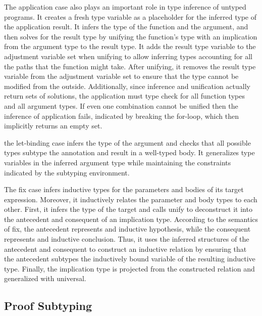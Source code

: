 \documentclass[acmsmall]{acmart}
\theoremstyle{definition}
\begin{document}
The application case also plays an important role in type inference of untyped programs.
It creates a fresh type variable as a placeholder for the inferred type of the application result.
It infers the type of the function and the argument, and then solves for the result type
by unifying the function's type with an implication from the argument type to the result type.
It adds the result type variable to the adjustment variable set when unifying to allow inferring 
types accounting for all the paths that the function might take.
After unifying, it removes the result type variable from the adjustment variable set to ensure
that the type cannot be modified from the outside.
Additionally, since inference and unification actually return sets of solutions,
the application must type check for all function types and all argument types.
If even one combination cannot be unified then the inference of application fails,
indicated by breaking the for-loop, which then implicitly returns an empty set.  


the let-binding case infers the type of the argument and checks that
all possible types subtype the annotation and result in a well-typed body. 
It generalizes type variables in the inferred argument type while maintaining
the constraints indicated by the subtyping environment. 



The fix case infers inductive types for the parameters and bodies of its
target expression. Moreover, it inductively relates the parameter and body types to each other.
First, it infers the type of the target and calls unify to deconstruct it into the antecedent
and consequent of an implication type. According to the semantics of fix, the antecedent
represents and inductive hypothesis, while the consequent represents and inductive conclusion.
Thus, it uses the inferred structures of the antecedent and consequent to construct an 
inductive relation by ensuring that the antecedent subtypes the inductively bound variable of 
the resulting inductive type.
Finally, the implication type is projected from the constructed relation and generalized with universal.

\subsection{Proof Subtyping}
\end{document}
